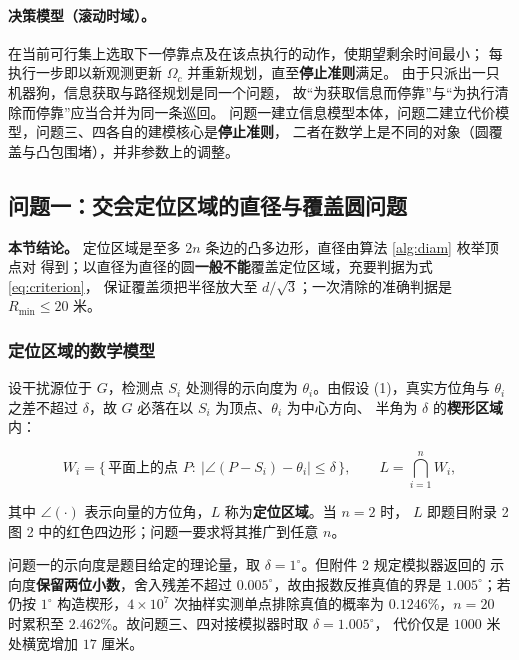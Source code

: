 \documentclass[withoutpreface, bwprint]{cumcmthesis}
\begin{document}
\paragraph{决策模型（滚动时域\cite{jiang}）。}
在当前可行集上选取下一停靠点及在该点执行的动作，使期望剩余时间最小；
每执行一步即以新观测更新 $\Omega_c$ 并重新规划，直至\textbf{停止准则}满足。
由于只派出一只机器狗，信息获取与路径规划是同一个问题，
故“为获取信息而停靠”与“为执行清除而停靠”应当合并为同一条巡回。
问题一建立信息模型本体，问题二建立代价模型，问题三、四各自的建模核心是\textbf{停止准则}，
二者在数学上是不同的对象（圆覆盖与凸包围堵），并非参数上的调整。

\subsection{问题一：交会定位区域的直径与覆盖圆问题}
\label{sec:p1}

\textbf{本节结论。} 定位区域是至多 $2n$ 条边的凸多边形，直径由算法 \ref{alg:diam} 枚举顶点对
得到；以直径为直径的圆\textbf{一般不能}覆盖定位区域，充要判据为式 \eqref{eq:criterion}，
保证覆盖须把半径放大至 $d/\sqrt3$；一次清除的准确判据是 $R_{\min}\le20$ 米。

\subsubsection{定位区域的数学模型}

设干扰源位于 $G$，检测点 $S_i$ 处测得的示向度为 $\theta_i$。由假设 (1)，真实方位角与
$\theta_i$ 之差不超过 $\delta$，故 $G$ 必落在以 $S_i$ 为顶点、$\theta_i$ 为中心方向、
半角为 $\delta$ 的\textbf{楔形区域}内：

\begin{equation}
  \label{eq:wedge}
  W_i=\bigl\{\,\text{平面上的点 }P:\ \lvert\angle(P-S_i)-\theta_i\rvert\le\delta\,\bigr\},
  \qquad
  L=\bigcap_{i=1}^{n}W_i ,
\end{equation}

其中 $\angle(\cdot)$ 表示向量的方位角，$L$ 称为\textbf{定位区域}。当 $n=2$ 时，
$L$ 即题目附录 2 图 2 中的红色四边形；问题一要求将其推广到任意 $n$。

问题一的示向度是题目给定的理论量，取 $\delta=1^\circ$。但附件 2 规定模拟器返回的
示向度\textbf{保留两位小数}，舍入残差不超过 $0.005^\circ$，故由报数反推真值的界是
$1.005^\circ$；若仍按 $1^\circ$ 构造楔形，$4\times10^7$ 次抽样实测单点排除真值的概率为
$0.1246\%$，$n=20$ 时累积至 $2.462\%$。故问题三、四对接模拟器时取 $\delta=1.005^\circ$，
代价仅是 $1000$ 米处横宽增加 $17$ 厘米。
\end{document}
